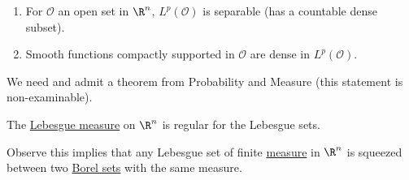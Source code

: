 \documentclass[twoside]{article}
\begin{document}
\begin{thm}[Density-separability of $L^p(\R^n)$, $p \in [1, +\infty)$]
    \leavevmode
    \begin{enumerate}[label=(\arabic*)]
        \item For $\mathcal{O}$ an open set in $\R^n$, $L^p(\mathcal{O})$ is separable (has a countable dense subset).
        \item Smooth functions compactly supported in $\mathcal{O}$ are dense in $L^p(\mathcal{O})$.
    \end{enumerate}
\end{thm}

We need and admit a theorem from Probability and Measure (this statement is non-examinable).
\begin{thm}
    The \hyperlink{def:lebMeas}{Lebesgue measure} on $\R^n$ is regular for the Lebesgue sets.
\end{thm}
Observe this implies that any Lebesgue set of finite \hyperlink{def:measure}{measure} in $\R^n$ is squeezed between two \hyperlink{def:borelSet}{Borel sets} with the same measure.
\end{document}
